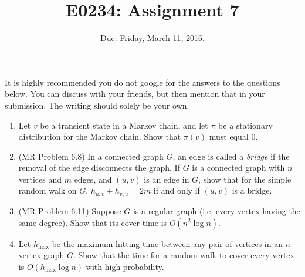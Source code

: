 \documentclass[11pt]{article}
\begin{document}
\def\Exp{\mathbf{Exp}}
\def\Var{\mathbf{Var}}
\title{E0234: Assignment 7}
\author{}
\date{Due: Friday, March 11, 2016.}
\maketitle
It is highly recommended you do not google for the answers to the questions below. You can discuss with your friends, but then mention that in your submission.
The writing should solely be your own.

\begin{enumerate}
\item 
Let $v$ be a transient state in a Markov chain, and let $\pi$ be a stationary distribution for the Markov chain. Show that $\pi(v)$ must equal $0$.

\item
(MR Problem 6.8) In a connected graph $G$, an edge is called a {\em bridge} if the removal of the edge disconnects the graph. If $G$ is a connected graph with $n$ vertices and $m$ edges, and $(u,v)$ is an edge in $G$, show that for the simple random walk on $G$, $h_{u,v} + h_{v,u} = 2m$ if and only if $(u,v)$ is a bridge.

\item
(MR Problem 6.11)
Suppose $G$ is a regular graph (i.e, every vertex having the same degree). Show that its cover time is $O(n^2 \log n)$. 

\item
Let $h_{\text{max}}$ be the maximum hitting time between any pair of vertices in an $n$-vertex graph $G$. Show that the time for a random walk to cover every vertex is $O(h_{\text{max}} \log n)$ with high probability.
\end{enumerate}
\end{document}
